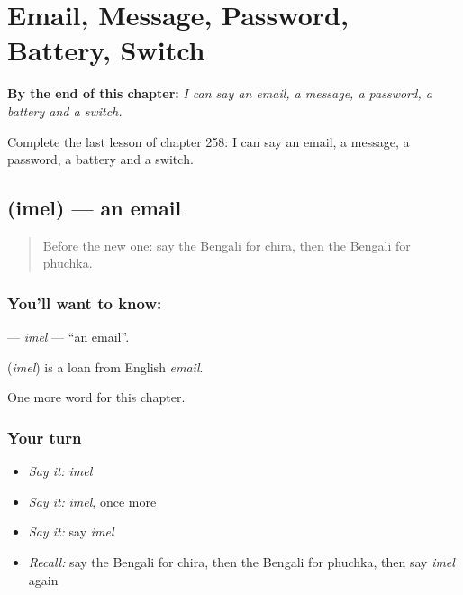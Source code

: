 
\chapter{Email, Message, Password, Battery, Switch}
\label{ch:bn-email-message-password-battery-switch}

\begin{chapteropening}
\textbf{By the end of this chapter:} \emph{I can say an email, a message, a password, a battery and a switch.}

Complete the last lesson of chapter 258: I can say an email, a message, a password, a battery and a switch.
\end{chapteropening}

\section[\texorpdfstring{\bn{ইমেল} (imel)}{ইমেল (imel)}]{ (imel) — an email}

\label{lesson:BN-C258-imel}



\begin{quote}
Before the new one: say the Bengali for chira, then the Bengali for phuchka.
\end{quote}

\subsection*{You'll want to know: }
\textbf{} — \emph{imel} — \textquotedblleft{}an email\textquotedblright{}.

\begin{cousinweb}
\textbf{} (\emph{imel}) is a loan from English \emph{email}.
\end{cousinweb}

\begin{grammarlens}[title={What you've built}]
One more word for this chapter.
\end{grammarlens}

\subsection*{Your turn}
\begin{itemize}
\raggedright
  \item \emph{Say it:} \emph{imel}
  \item \emph{Say it:} \emph{imel}, once more
  \item \emph{Say it:} say \emph{imel}
  \item \emph{Recall:} say the Bengali for chira, then the Bengali for phuchka, then say \emph{imel} again
\end{itemize}

